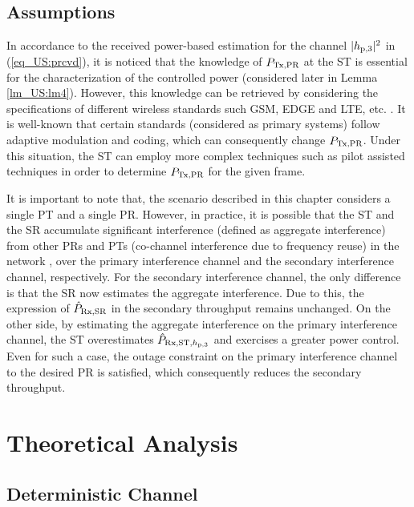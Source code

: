 \subsection{Assumptions} \label{ssec_US:as}
In accordance to the received power-based estimation for the channel $|h_{\text{p,3}}|^2$ in (\ref{eq_US:prcvd}), it is noticed that the knowledge of $P_{\text{Tx,PR}}$ at the ST is essential for the characterization of the controlled power (considered later in Lemma \ref{lm_US:lm4}). However, this knowledge can be retrieved by considering the specifications of different wireless standards such GSM, EDGE and LTE, etc. \cite{Sharma14}. It is well-known that certain standards (considered as primary systems) follow adaptive modulation and coding, which can consequently change $P_{\text{Tx,PR}}$. Under this situation, the ST can employ more complex techniques such as pilot assisted techniques in order to determine $P_{\text{Tx,PR}}$ for the given frame.

It is important to note that, the scenario described in this chapter considers a single PT and a single PR. However, in practice, it is possible that the ST and the SR accumulate significant interference (defined as aggregate interference) from other PRs and PTs (co-channel interference due to frequency reuse) in the network \cite{Elsawy13_cmag},  over the primary interference channel and the secondary interference channel, respectively. For the secondary interference channel, the only difference is that the SR now estimates the aggregate interference. Due to this, the expression of $\hat{P}_{\text{Rx,SR}}$ in the secondary throughput remains unchanged. On the other side, by estimating the aggregate interference on the primary interference channel, the ST overestimates $\hat{P}_{\text{Rx,ST,$h_{\text{p,3}}$}}$ and exercises a greater power control. Even for such a case, the outage constraint on the primary interference channel to the desired PR is satisfied, which consequently reduces the secondary throughput.  
\section{Theoretical Analysis} \label{sec_US:th_ana}

\subsection{Deterministic Channel} \label{ssec_US:stpa}

